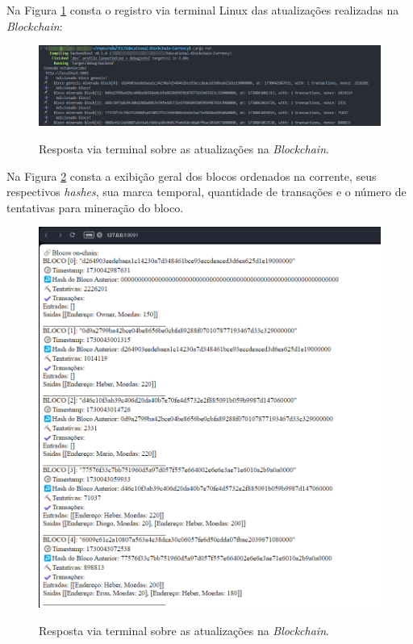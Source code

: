 \documentclass[article,12pt,oneside,a4paper,english,brazil]{unifil}
\begin{document}
\begin{Spacing}{1.5}
Na Figura \ref*{fig:terminal} consta o registro via terminal Linux das atualizações realizadas na \textit{Blockchain}:

\begin{figure} [h]
	\centering
	\caption{Resposta via terminal sobre as atualizações na \textit{Blockchain}.}
	\includegraphics[width=1\linewidth]{../images/terminal-blockchain.png}
	\label{fig:terminal}

\end{figure}

Na Figura \ref*{fig:navegador} consta a exibição geral dos blocos ordenados na corrente, seus respectivos \textit{hashes}, sua marca temporal, quantidade de transações e o número de tentativas para mineração do bloco.

\begin{figure} [h]
	\centering
	\caption{Resposta via terminal sobre as atualizações na \textit{Blockchain}.}
	\includegraphics[width=1\linewidth]{../images/navegador-blockchain.png}
	\label{fig:navegador}


\end{figure}
\end{Spacing}
\end{document}
